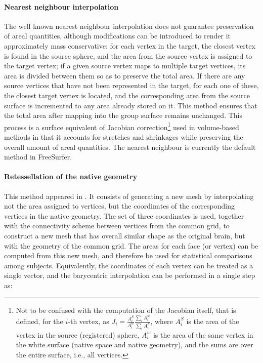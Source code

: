 \paragraph{Nearest neighbour interpolation}

The well known nearest neighbour interpolation does not guarantee preservation of areal quantities, although modifications can be introduced to render it approximately mass conservative: for each vertex in the target, the closest vertex is found in the source sphere, and the area from the source vertex is assigned to the target vertex; if a given source vertex maps to multiple target vertices, its area is divided between them so as to preserve the total area. If there are any source vertices that have not been represented in the target, for each one of these, the closest target vertex is located, and the corresponding area from the source surface is incremented to any area already stored on it. This method ensures that the total area after mapping into the group surface remains unchanged. This process is a surface equivalent of Jacobian correction\footnote{Not to be confused with the computation of the Jacobian itself, that is defined, for the $i$-th vertex, as $J_i = \frac{A^S_i}{A^w_i}\frac{\sum_i A^w_i}{\sum_i A^S_i}$, where $A^S_i$ is the area of the vertex in the source (registered) sphere, $A^w_i$ is the area of the same vertex in the white surface (native space and native geometry), and the sums are over the entire surface, i.e., all vertices.} used in volume-based methods in that it accounts for stretches and shrinkages while preserving the overall amount of areal quantities. The nearest neighbour is currently the default method in FreeSurfer.

\paragraph{Retessellation of the native geometry}

This method appeared in \citet{Saad2004}. It consists of generating a new mesh by interpolating not the area assigned to vertices, but the coordinates of the corresponding vertices in the native geometry. The set of three coordinates is used, together with the connectivity scheme between vertices from the common grid, to construct a new mesh that has overall similar shape as the original brain, but with the geometry of the common grid. The areas for each face (or vertex) can be computed from this new mesh, and therefore be used for statistical comparisons among subjects. Equivalently, the coordinates of each vertex can be treated as a single vector, and the barycentric interpolation can be performed in a single step as:


